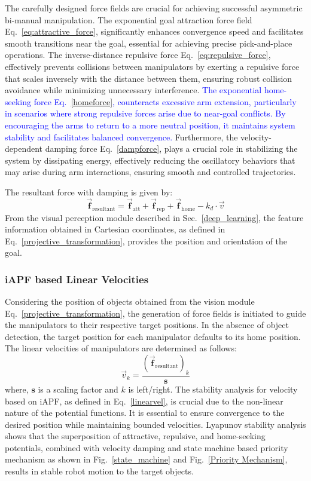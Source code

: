 \documentclass[utf8]{FrontiersinHarvard}
\begin{document}
The carefully designed force fields are crucial for achieving successful asymmetric bi-manual manipulation. The exponential goal attraction force field Eq.~\ref{eq:attractive_force}, significantly enhances convergence speed and facilitates smooth transitions near the goal, essential for achieving precise pick-and-place operations. The inverse-distance repulsive force Eq.~\ref{eq:repulsive_force}, effectively prevents collisions between manipulators by exerting a repulsive force that scales inversely with the distance between them, ensuring robust collision avoidance while minimizing unnecessary interference. \textcolor{blue}{The exponential home-seeking force Eq.~\ref{homeforce}, counteracts excessive arm extension, particularly in scenarios where strong repulsive forces arise due to near-goal conflicts. By encouraging the arms to return to a more neutral position, it maintains system stability and facilitates balanced convergence.} Furthermore, the velocity-dependent damping force Eq.~\ref{dampforce}, plays a crucial role in stabilizing the system by dissipating energy, effectively reducing the oscillatory behaviors that may arise during arm interactions, ensuring smooth and controlled trajectories.

\noindent The resultant force with damping is given by:
\begin{equation}
\vec{\mathbf{f}}_{\text{resultant}} = \vec{\mathbf{f}}_{\text{att}} + \vec{\mathbf{f}}_{\text{rep}} + \vec{\mathbf{f}}_{\text{home}} - k_d \cdot \vec{{v}}
\label{eq:resultant_force}
\end{equation}
From the visual perception module described in Sec.~\ref{deep_learning}, the feature information obtained in Cartesian coordinates, as defined in Eq.~\ref{projective_transformation}, provides the position and orientation of the goal.
\subsubsection{iAPF based Linear Velocities}
Considering the position of objects obtained from the vision module Eq.~\ref{projective_transformation}, the generation of force fields is initiated to guide the manipulators to their respective target positions. In the absence of object detection, the target position for each manipulator defaults to its home position. The linear velocities of manipulators are determined as follows:
\begin{equation}
    \vec{v}_{k} = \frac{(\vec{\mathbf{f}}_{\text{resultant}})_{k}}{\mathbf{s}}
    \label{linearvel}
\end{equation}
where, $\mathbf{s}$ is a scaling factor and $k$ is left/right.
The stability analysis for velocity based on iAPF, as defined in Eq.~\ref{linearvel}, is crucial due to the non-linear nature of the potential functions. It is essential to ensure convergence to the desired position while maintaining bounded velocities. Lyapunov stability analysis shows that the superposition of attractive, repulsive, and home-seeking potentials, combined with velocity damping and state machine based priority mechanism as shown in Fig.~\ref{state_machine} and Fig.~\ref{Priority Mechanism}, results in stable robot motion to the target objects.
\end{document}
